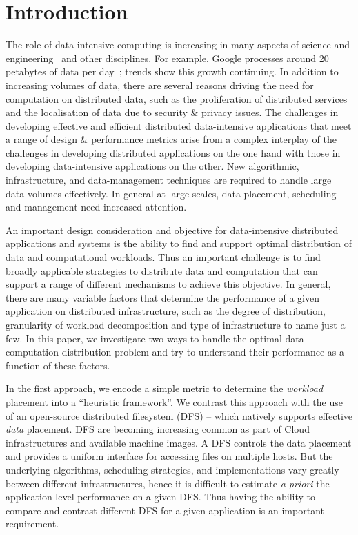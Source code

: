 \documentclass{rspublic}
\begin{document}
\vspace{-0.5cm}

\section{Introduction} 
The role of data-intensive computing is increasing in many aspects of
science and engineering~\citep{fourthparadigm} and other
disciplines. For example, Google processes around 20 petabytes of data
per day~\citep{google}; trends show this growth continuing. In
addition to increasing volumes of data, there are several reasons
driving the need for computation on distributed data, such as the
proliferation of distributed services and the localisation of data due
to security \& privacy issues. The challenges in developing effective
and efficient distributed data-intensive applications that meet a
range of design \& performance metrics arise from a complex interplay
of the challenges in developing distributed applications on the one
hand with those in developing data-intensive applications on the
other. New algorithmic, infrastructure, and data-management techniques
are required to handle large data-volumes effectively. In general at
large scales, data-placement, scheduling and management need increased
attention.

An important design consideration and objective for data-intensive
distributed applications and systems is the ability to find and
support optimal distribution of data and computational workloads. Thus
an important challenge is to find broadly applicable strategies to
distribute data and computation that can support a range of different
mechanisms to achieve this objective. In general, there are many
variable factors that determine the performance of a given application
on distributed infrastructure, such as the degree of distribution,
granularity of workload decomposition and type of infrastructure to
name just a few.  In this paper, we investigate two ways to handle the
optimal data-computation distribution problem and try to understand
their performance as a function of these factors.

In the first approach, we encode a simple metric to determine the {\it
  workload} placement into a ``heuristic framework''. We contrast this
approach with the use of an open-source distributed filesystem (DFS)
-- which natively supports effective {\it data} placement.  DFS are
becoming increasing common as part of Cloud infrastructures and
available machine images. A DFS controls the data placement and
provides a uniform interface for accessing files on multiple hosts.
But the underlying algorithms, scheduling strategies, and
implementations vary greatly between different infrastructures, hence
it is difficult to estimate {\it a priori} the application-level
performance on a given DFS.  Thus having the ability to compare and
contrast different DFS for a given application is an important
requirement.
\end{document}
